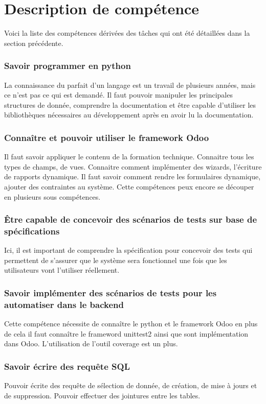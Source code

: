 \section{Description de compétence}
Voici la liste des compétences dérivées des tâches qui ont été détaillées dans la section précédente. 
\subsubsection{Savoir programmer en python}
La connaissance du parfait d'un langage est un travail de plusieurs années, mais ce n'est pas ce qui est demandé. Il faut pouvoir manipuler les principales structures de donnée, comprendre la documentation et être capable d'utiliser les bibliothèques nécessaires au développement après en avoir lu la documentation. 




\subsubsection{Connaître et pouvoir utiliser le framework Odoo}
Il faut savoir appliquer le contenu de la formation technique. Connaitre tous les types de champs, de vues. Connaitre comment implémenter des wizards, l'écriture de rapports dynamique. 
Il faut savoir comment rendre les formulaires dynamique, ajouter des contraintes au système. Cette compétences peux encore se découper en plusieurs sous compétences. 
\subsubsection{Être capable de concevoir des scénarios de tests sur base de spécifications}
Ici, il est important de comprendre la spécification pour concevoir des tests qui permettent de s'assurer que le système sera fonctionnel une fois que les utilisateurs vont l'utiliser réellement. 
\subsubsection{Savoir implémenter des scénarios de tests pour les automatiser dans le backend}
Cette compétence nécessite de connaître le python et le framework Odoo en plus de cela il faut connaître le frameword unittest2 ainsi que sont implémentation dans Odoo. L'utilisation de l’outil coverage est un plus. 

\subsubsection{Savoir écrire des requête SQL}
Pouvoir écrite des requête de sélection de donnée, de création, de mise à jours et de suppression. Pouvoir effectuer des jointures entre les tables. 


